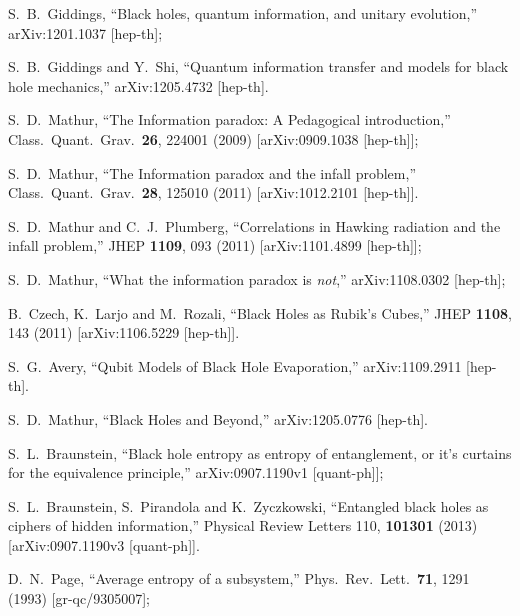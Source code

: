 \documentclass[12pt]{article}
\begin{document}
\begin{thebibliography}{99}
  S.~B.~Giddings,
  ``Black holes, quantum information, and unitary evolution,''
  arXiv:1201.1037 [hep-th];

  S.~B.~Giddings and Y.~Shi,
  ``Quantum information transfer and models for black hole mechanics,''
  arXiv:1205.4732 [hep-th].

  S.~D.~Mathur,
  ``The Information paradox: A Pedagogical introduction,''
  Class.\ Quant.\ Grav.\  {\bf 26}, 224001 (2009)
  [arXiv:0909.1038 [hep-th]];

  S.~D.~Mathur,
  ``The Information paradox and the infall problem,''
  Class.\ Quant.\ Grav.\  {\bf 28}, 125010 (2011)
  [arXiv:1012.2101 [hep-th]].

  S.~D.~Mathur and C.~J.~Plumberg,
  ``Correlations in Hawking radiation and the infall problem,''
  JHEP {\bf 1109}, 093 (2011)
  [arXiv:1101.4899 [hep-th]];

    S.~D.~Mathur,
  ``What the information paradox is {\it not},''
  arXiv:1108.0302 [hep-th];

  B.~Czech, K.~Larjo and M.~Rozali,
  ``Black Holes as Rubik's Cubes,''
  JHEP {\bf 1108}, 143 (2011)
  [arXiv:1106.5229 [hep-th]].


  S.~G.~Avery,
  ``Qubit Models of Black Hole Evaporation,''
  arXiv:1109.2911 [hep-th].



  S.~D.~Mathur,
  ``Black Holes and Beyond,''
  arXiv:1205.0776 [hep-th].
  
  S.~L.~Braunstein,
  ``Black hole entropy as entropy of entanglement, or it's curtains for the equivalence principle,''
  arXiv:0907.1190v1 [quant-ph]];
  
  S.~L.~Braunstein, S.~Pirandola and K.~Zyczkowski,
  ``Entangled black holes as ciphers of hidden information,''
  Physical Review Letters 110, {\bf 101301} (2013)
  [arXiv:0907.1190v3 [quant-ph]].


  D.~N.~Page,
  ``Average entropy of a subsystem,''
  Phys.\ Rev.\ Lett.\  {\bf 71}, 1291 (1993)
  [gr-qc/9305007];


\end{thebibliography}
\end{document}

